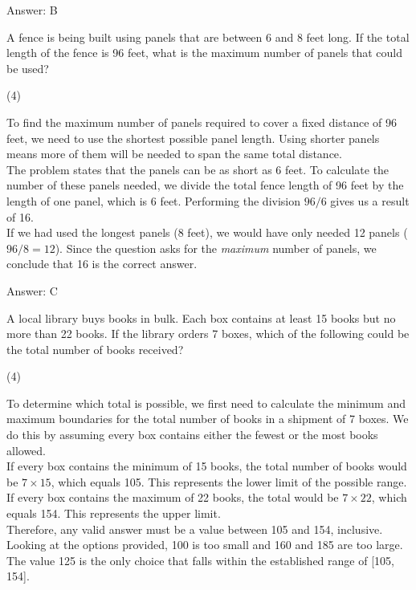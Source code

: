 \documentclass[11pt,paper=a4,answers]{exam}
\begin{document}
\begin{questions}
\begin{solution}
\vspace{15pt}
Answer: \colorbox{yellow!100}{B}
\end{solution}

\question
A fence is being built using panels that are between 6 and 8 feet long. If the total length of the fence is 96 feet, what is the maximum number of panels that could be used?
\begin{tasks}(4)
\end{tasks}

\begin{solution}
To find the maximum number of panels required to cover a fixed distance of 96 feet, we need to use the shortest possible panel length. Using shorter panels means more of them will be needed to span the same total distance.
\\[10pt]
The problem states that the panels can be as short as 6 feet. To calculate the number of these panels needed, we divide the total fence length of 96 feet by the length of one panel, which is 6 feet. Performing the division $96 / 6$ gives us a result of 16.
\\[10pt]
If we had used the longest panels (8 feet), we would have only needed 12 panels ($96 / 8 = 12$). Since the question asks for the \textit{maximum} number of panels, we conclude that 16 is the correct answer.

\vspace{15pt}
Answer: \colorbox{yellow!100}{C}
\end{solution}

\question
A local library buys books in bulk. Each box contains at least 15 books but no more than 22 books. If the library orders 7 boxes, which of the following could be the total number of books received?
\begin{tasks}(4)
\end{tasks}

\begin{solution}
To determine which total is possible, we first need to calculate the minimum and maximum boundaries for the total number of books in a shipment of 7 boxes. We do this by assuming every box contains either the fewest or the most books allowed.
\\[10pt]
If every box contains the minimum of 15 books, the total number of books would be $7 \times 15$, which equals 105. This represents the lower limit of the possible range. If every box contains the maximum of 22 books, the total would be $7 \times 22$, which equals 154. This represents the upper limit.
\\[10pt]
Therefore, any valid answer must be a value between 105 and 154, inclusive. Looking at the options provided, 100 is too small and 160 and 185 are too large. The value 125 is the only choice that falls within the established range of [105, 154].


\end{solution}
\end{questions}
\end{document}

